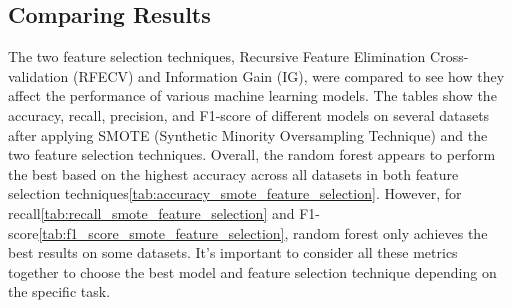 \documentclass[12pt]{report}
\begin{document}
\subsection*{Comparing Results}

The two feature selection techniques, Recursive Feature Elimination
Cross-validation (RFECV) and Information Gain (IG), were compared to see how
they affect the performance of various machine learning models. The tables show
the accuracy, recall, precision, and F1-score of different models on several
datasets after applying SMOTE (Synthetic Minority Oversampling Technique) and
the two feature selection techniques. Overall, the random forest appears to perform
the best based on the highest accuracy across all datasets in both feature
selection techniques\ref{tab:accuracy_smote_feature_selection}. However, for
recall\ref{tab:recall_smote_feature_selection} and
F1-score\ref{tab:f1_score_smote_feature_selection}, random forest only achieves
the best results on some datasets. It's important to consider all these metrics
together to choose the best model and feature selection technique depending on
the specific task.\\
\end{document}
